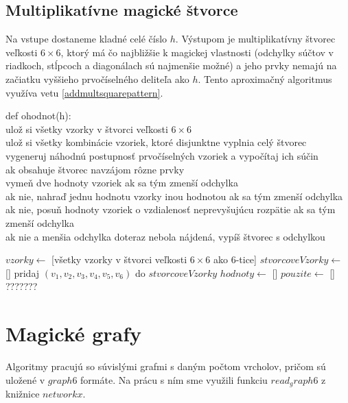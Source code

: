\subsection{Multiplikatívne magické štvorce} 

\begin{subalg} Na vstupe dostaneme kladné celé číslo $h$. Výstupom je multiplikatívny štvorec veľkosti $6 \times 6$, ktorý má čo najbližšie k magickej vlastnosti (odchylky súčtov v riadkoch, stĺpcoch a diagonálach sú najmenšie možné) a jeho prvky nemajú na začiatku vyššieho prvočíselného deliteľa ako $h$. Tento aproximačný algoritmus využíva vetu \ref{addmultsquarepattern}.
\end{subalg}

\begin{subcode}
def ohodnot(h): \\
ulož si všetky vzorky v štvorci veľkosti $6 \times 6$ \\
ulož si všetky kombinácie vzoriek, ktoré disjunktne vyplnia celý štvorec \\
vygeneruj náhodnú postupnosť prvočíselných vzoriek a vypočítaj ich súčin \\
ak obsahuje štvorec navzájom rôzne prvky \\
vymeň dve hodnoty vzoriek ak sa tým zmenší odchylka \\
ak nie, nahraď jednu hodnotu vzorky inou hodnotou ak sa tým zmenší odchylka \\
ak nie, posuň hodnoty vzoriek o vzdialenosť neprevyšujúcu rozpätie ak sa tým zmenší odchylka \\
ak nie a menšia odchylka doteraz nebola nájdená, vypíš štvorec s odchylkou
\end{subcode}

\begin{algorithmic}
\STATE $vzorky \gets$ [všetky vzorky v štvorci veľkosti $6 \times 6$ ako 6-tice]
\STATE $stvorcoveVzorky \gets $ []
	\STATE pridaj $(v_1,v_2,v_3,v_4,v_5,v_6)$ do $stvorcoveVzorky$
    \ENDIF
\ENDFOR
{}
	\STATE $hodnoty \gets$ []
	\STATE $pouzite \gets$ []
	\STATE ???????
\ENDWHILE
\end{algorithmic}

\section{Magické grafy}

Algoritmy pracujú so súvislými grafmi s daným počtom vrcholov, pričom sú uložené v $graph6$ formáte. Na prácu s ním sme využili funkciu $read_graph6$ z knižnice $networkx$. \\

